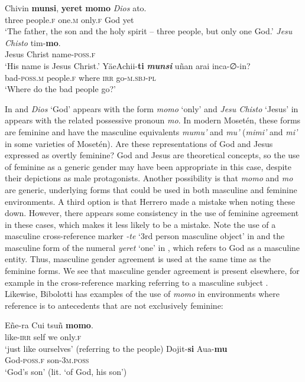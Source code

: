 \documentclass[output=paper,colorlinks,citecolor=brown
]{langscibook}
\begin{document}
     Chivin \textbf{munsi}, 		\textbf{yeret} 	\textbf{momo} 	\emph{Dios} 	ato.\\
    three	people.\textsc{f}	one.\textsc{m}	only.\textsc{f}	God	yet\\
\glt ‘The father, the son and the holy spirit – three people, but only one God.’
\ex \label{sakel_example_8}
\gll \emph{Jesu} \emph{Chisto} 	tim-\textbf{mo}.\\
     Jesus Christ	name-\textsc{poss.f}\\
\glt ‘His name is Jesus Christ.’
\ex \label{sakel_example_9}
\gll YäeAchii-\textbf{ti} 	\textbf{\emph{munsi}} 		uñan 	arai 	inca-∅-in?\\
     bad-\textsc{poss.m}	people.\textsc{f}	where	\textsc{irr}	go-\textsc{m.sbj-pl}\\
\glt ‘Where do the bad people go?’
\z

In  and  \textit{Dios} ‘God’ appears with the form \textit{momo} ‘only’ and \textit{Jesu Chisto} ‘Jesus’ in  appears with the related possessive pronoun \textit{mo}. In modern Mosetén, these forms are feminine and have the masculine equivalents \textit{mumu’} and \textit{mu’} (\textit{mimi’} and \textit{mi’} in some varieties of Mosetén). Are these representations of God and Jesus expressed as overtly feminine? God and Jesus are theoretical concepts, so the use of feminine as a generic gender may have been appropriate in this case, despite their depictions as male protagonists. Another possibility is that \textit{momo} and \textit{mo} are generic, underlying forms that could be used in both masculine and feminine environments. A third option is that Herrero made a mistake when noting these down. However, there appears some consistency in the use of feminine agreement in these cases, which makes it less likely to be a mistake. 
Note the use of a masculine cross-reference marker \textit{-te} ‘3rd person masculine object’ in  and the masculine form of the numeral \textit{yeret} ‘one’ in , which refers to God as a masculine entity. Thus, masculine gender agreement is used at the same time as the feminine forms. We see that masculine gender agreement is present elsewhere, for example in the cross-reference marking referring to a masculine subject . 
Likewise, Bibolotti has examples of the use of \textit{momo} in environments where reference is to antecedents that are not exclusively feminine: 

\ea \label{sakel_example_10}
\gll Eñe-ra 	Cui 	tsuñ 	\textbf{momo}.\\
     like-\textsc{irr}	self	we	only.\textsc{f}\\
\glt ‘just like ourselves’ (referring to the people)
\ex \label{sakel_example_11}
\gll Dojit-\textbf{si} 	Aua-\textbf{mu}\\
     God-\textsc{poss.f}	son-3\textsc{m.poss}\\
\glt ‘God’s son’ (lit. ‘of God, his son’)
\z	
\end{document}
